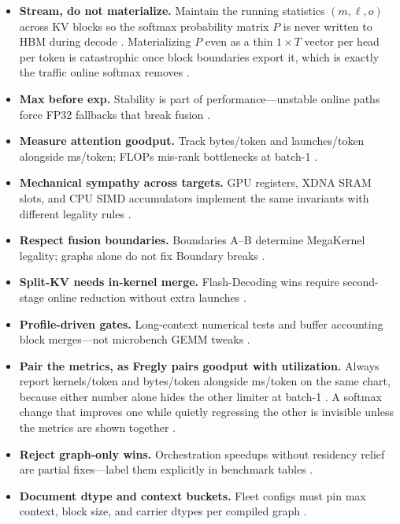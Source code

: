 \begin{itemize}
\item \textbf{Stream, do not materialize.} Maintain the running statistics $(m,\ell,o)$ across KV blocks so the softmax probability matrix $P$ is never written to HBM during decode \citep{dao2022flashattention,memoryfloor2026}. Materializing $P$ even as a thin $1\times T$ vector per head per token is catastrophic once block boundaries export it, which is exactly the traffic online softmax removes \citep{taxbreak2026,kwon2023vllm}.
\item \textbf{Max before \textbf{exp}.} Stability is part of performance---unstable online paths force FP32 fallbacks that break fusion \citep{dao2022flashattention,patel2025llminference}.
\item \textbf{Measure attention goodput.} Track bytes/token and launches/token alongside ms/token; FLOPs mis-rank bottlenecks at batch-1 \citep{taxbreak2026,dlbook}.
\item \textbf{Mechanical sympathy across targets.} GPU registers, XDNA SRAM slots, and CPU SIMD accumulators implement the same invariants with different legality rules \citep{amd2024xdna,semianalysis2024tma,dlbook}.
\item \textbf{Respect fusion boundaries.} Boundaries A--B determine MegaKernel legality; graphs alone do not fix Boundary breaks \citep{memoryfloor2026,nvidia2024cudagraphs,yirage2026}.
\item \textbf{Split-KV needs in-kernel merge.} Flash-Decoding wins require second-stage online reduction without extra launches \citep{dao2023flashdecoding,taxbreak2026}.
\item \textbf{Profile-driven gates.} Long-context numerical tests and buffer accounting block merges---not microbench GEMM tweaks \citep{yirage2026,chen2020compilerbasedhardw}.

\item \textbf{Pair the metrics, as Fregly pairs goodput with utilization.} Always report kernels/token and bytes/token alongside ms/token on the same chart, because either number alone hides the other limiter at batch-1 \citep{taxbreak2026,memoryfloor2026}. A softmax change that improves one while quietly regressing the other is invisible unless the metrics are shown together \citep{patel2025llminference,dlbook}.
\item \textbf{Reject graph-only wins.} Orchestration speedups without residency relief are partial fixes---label them explicitly in benchmark tables \citep{nvidia2024cudagraphs,memoryfloor2026}.
\item \textbf{Document dtype and context buckets.} Fleet configs must pin max context, block size, and carrier dtypes per compiled graph \citep{kwon2023vllm,yirage2026,amd2024aie}.
\end{itemize}



